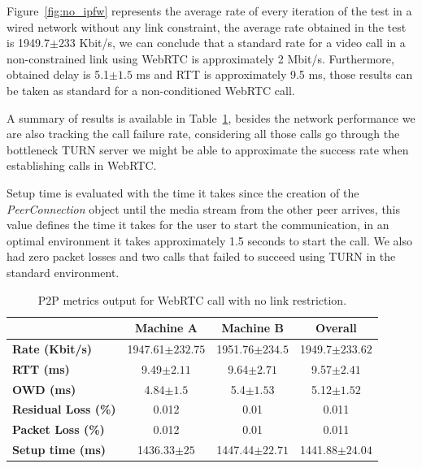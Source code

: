 Figure~\ref{fig:no_ipfw} represents the average rate of every iteration of the test in a wired network without any link constraint, the average rate obtained in the test is 1949.7$\pm233$ Kbit/s, we can conclude that a standard rate for a video call in a non-constrained link using WebRTC is approximately 2 Mbit/s. Furthermore, obtained delay is 5.1$\pm1.5$ ms and RTT is approximately 9.5 ms, those results can be taken as standard for a non-conditioned WebRTC call. 

A summary of results is available in Table~\ref{fig:p2p_no_ipfw}, besides the network performance we are also tracking the call failure rate, considering all those calls go through the bottleneck TURN server we might be able to approximate the success rate when establishing calls in WebRTC. 

Setup time is evaluated with the time it takes since the creation of the {\it PeerConnection} object until the media stream from the other peer arrives, this value defines the time it takes for the user to start the communication, in an optimal environment it takes approximately 1.5 seconds to start the call. We also had zero packet losses and two calls that failed to succeed using TURN in the standard environment.

\begin{table}[h]
\begin{center}
	\begin{tabular}{| l | c | c | c |}
	\hline
    	 & Machine A & Machine B & Overall \\ \hline
	\textbf{Rate (Kbit/s)} & 1947.61$\pm232.75$ & 1951.76$\pm234.5$ & 1949.7$\pm233.62$\\\hline
	\textbf{RTT (ms)} & 9.49$\pm2.11$ & 9.64$\pm2.71$ & 9.57$\pm2.41$\\\hline
	\textbf{OWD (ms)} & 4.84$\pm1.5$ & 5.4$\pm1.53$ & 5.12$\pm1.52$\\\hline
	\textbf{Residual Loss (\%)} & 0.012 & 0.01 & 0.011\\\hline
	\textbf{Packet Loss (\%)} & 0.012 & 0.01 & 0.011\\\hline
	\textbf{Setup time (ms)} & 1436.33$\pm25$ & 1447.44$\pm22.71$ & 1441.88$\pm24.04$\\
	\hline
	\end{tabular}
    \caption[P2P metrics output for WebRTC call with no link restriction]{P2P metrics output for WebRTC call with no link restriction.}
    \label{fig:p2p_no_ipfw}
\end{center}
\end{table}

